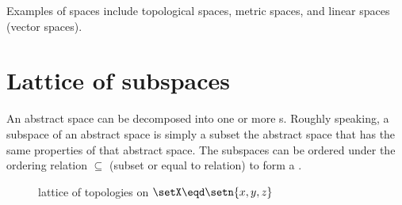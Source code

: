 Examples of spaces include topological spaces, metric spaces, and linear spaces (vector spaces).

\section{Lattice of subspaces}
An abstract space can be decomposed into one or more s. 
Roughly speaking, a subspace of an abstract space is simply a subset the abstract space 
that has the same properties of that abstract space.
The subspaces can be ordered under the ordering relation $\subseteq$ (subset or equal to relation)
to form a .

\begin{figure}[th]
\begin{center}
%
\end{center}
\caption{
  lattice of topologies on $\setX\eqd\setn{x,y,z}$ 
  \label{fig:set_latlat_top_xyz}
  }
\end{figure}


